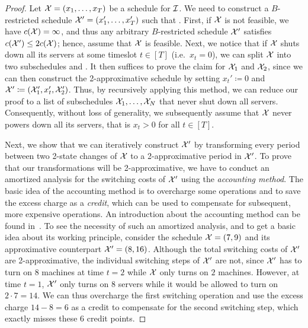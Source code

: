 \begin{proof}
Let $\mathcal{X}=(x_1,\dotsc,x_T)$ be a schedule for $\mathcal{I}$. We need to construct a $B$-restricted schedule $\mathcal{X}'=(x_1',\dotsc,x_T')$ such that .
First, if $\mathcal{X}$ is not feasible, we have $c(\mathcal{X})=\infty$, and thus any arbitrary $B$-restricted schedule $\mathcal{X}'$ satisfies $c(\mathcal{X}')\le2c(\mathcal{X})$; hence, assume that $\mathcal{X}$ is feasible. Next, we notice that if $\mathcal{X}$ shuts down all its servers at some timeslot $t\in[T]$ (i.e.\ $x_t=0$), we can split $\mathcal{X}$ into two subschedules  and . It then suffices to prove the claim for $\mathcal{X}_1$ and $\mathcal{X}_2$, since we can then construct the 2-approximative schedule by setting $x_t'\coloneqq 0$ and $\mathcal{X}'\coloneqq(\mathcal{X}_1',x_t',\mathcal{X}_2')$. Thus, by recursively applying this method, we can reduce our proof to a list of subschedules $\mathcal{X}_1,\dotsc,\mathcal{X}_N$ that never shut down all servers. Consequently, without loss of generality, we subsequently assume that $\mathcal{X}$ never powers down all its servers, that is $x_t>0$ for all $t\in[T]$. 
	
Next, we show that we can iteratively construct $\mathcal{X}'$ by transforming every period between two 2-state changes of $\mathcal{X}$ to a 2-approximative period in $\mathcal{X}'$. 
To prove that our transformations will be 2-approximative, we have to conduct an amortized analysis for the switching costs of $\mathcal{X}'$ using the \emph{accounting method}. The basic idea of the accounting method is to overcharge some operations and to save the excess charge as a \emph{credit}, which can be used to compensate for subsequent, more expensive operations. An introduction about the accounting method can be found in~\parencite[Section~17.2]{intro-algo}. To see the necessity of such an amortized analysis, and to get a basic idea about its working principle, consider the schedule $\mathcal{X}=(7,9)$ and its approximative counterpart $\mathcal{X}'=(8,16)$. Although the total switching costs of $\mathcal{X}'$ are 2-approximative, the individual switching steps of $\mathcal{X}'$ are not, since $\mathcal{X}'$ has to turn on $8$ machines at time $t=2$ while $\mathcal{X}$ only turns on $2$ machines. However, at time $t=1$, $\mathcal{X}'$ only turns on $8$ servers while it would be allowed to turn on $2\cdot7=14$. We can thus overcharge the first switching operation and use the excess charge $14-8=6$ as a credit to compensate for the second switching step, which exactly misses these $6$ credit points.


\end{proof}
